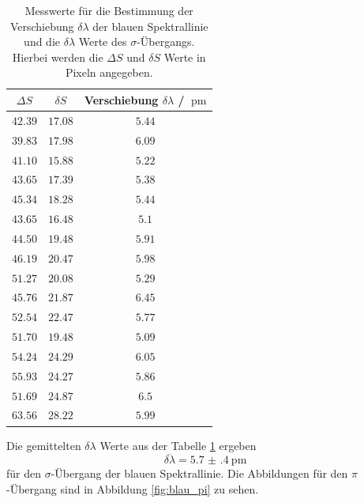 \begin{table}
    \centering
    \caption{Messwerte für die Bestimmung der Verschiebung $\delta \lambda$ der blauen Spektrallinie und die $\delta\lambda$ Werte des $\sigma$-Übergangs. Hierbei werden die $\Delta S$ und $\delta S$ Werte in Pixeln angegeben.}
    \label{tab:blau_sigma}
    \begin{tabular}{c c c}
        \toprule
        $\Delta S$&$\delta S$&Verschiebung $\delta \lambda$ / $\SI{}{\pico\meter}$\\
        \midrule 
        $\num{42.39}$&$\num{17.08}$&$\num{5.44}$\\
        $\num{39.83}$&$\num{17.98}$&$\num{6.09}$\\
        $\num{41.10}$&$\num{15.88}$&$\num{5.22}$\\
        $\num{43.65}$&$\num{17.39}$&$\num{5.38}$\\
        $\num{45.34}$&$\num{18.28}$&$\num{5.44}$\\
        $\num{43.65}$&$\num{16.48}$&$\num{5.1}$\\
        $\num{44.50}$&$\num{19.48}$&$\num{5.91}$\\
        $\num{46.19}$&$\num{20.47}$&$\num{5.98}$\\
        $\num{51.27}$&$\num{20.08}$&$\num{5.29}$\\
        $\num{45.76}$&$\num{21.87}$&$\num{6.45}$\\
        $\num{52.54}$&$\num{22.47}$&$\num{5.77}$\\
        $\num{51.70}$&$\num{19.48}$&$\num{5.09}$\\
        $\num{54.24}$&$\num{24.29}$&$\num{6.05}$\\
        $\num{55.93}$&$\num{24.27}$&$\num{5.86}$\\
        $\num{51.69}$&$\num{24.87}$&$\num{6.5}$\\
        $\num{63.56}$&$\num{28.22}$&$\num{5.99}$\\
        \bottomrule
    \end{tabular} 
\end{table}
\FloatBarrier
Die gemittelten $\delta \lambda$ Werte aus der Tabelle \ref{tab:blau_sigma} ergeben 
\begin{equation*}
    \overline{\delta\lambda} = \SI{5.7(4)}{\pico\meter}
\end{equation*}
für den $\sigma$-Übergang der blauen Spektrallinie.
Die Abbildungen für den $\pi$-Übergang sind in Abbildung \ref{fig:blau_pi} zu sehen.
\FloatBarrier
